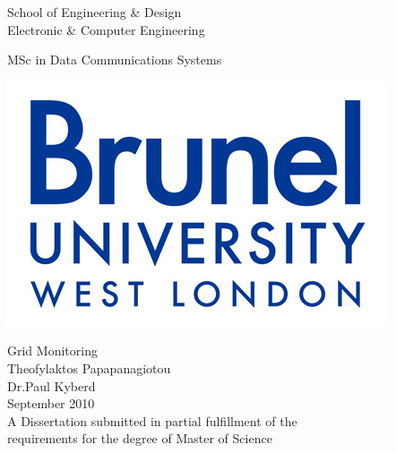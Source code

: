
\thispagestyle{empty}

\begin{center}
\Large
School of Engineering \& Design\\
Electronic \& Computer Engineering\\
\vspace{1\baselineskip}

MSc in Data Communications Systems\\
\vspace{1\baselineskip}

\includegraphics{images/brunellogo}\\
\vspace{1\baselineskip}

\Huge
Grid Monitoring\\
\vspace{1.5\baselineskip}
\Huge
Theofylaktos Papapanagiotou\\
Dr.Paul Kyberd\\
\vspace{1\baselineskip}
\large
September 2010\\
\vspace{0.5\baselineskip}
\large
A Dissertation submitted in partial fulfillment of the\\
requirements for the degree of Master of Science
\end{center}